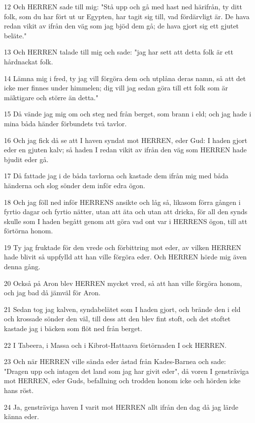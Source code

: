 \par 12 Och HERREN sade till mig: "Stå upp och gå med hast ned härifrån, ty ditt folk, som du har fört ut ur Egypten, har tagit sig till, vad fördärvligt är. De hava redan vikit av ifrån den väg som jag bjöd dem gå; de hava gjort sig ett gjutet beläte."
\par 13 Och HERREN talade till mig och sade: "jag har sett att detta folk är ett hårdnackat folk.
\par 14 Lämna mig i fred, ty jag vill förgöra dem och utplåna deras namn, så att det icke mer finnes under himmelen; dig vill jag sedan göra till ett folk som är mäktigare och större än detta."
\par 15 Då vände jag mig om och steg ned från berget, som brann i eld; och jag hade i mina båda händer förbundets två tavlor.
\par 16 Och jag fick då se att I haven syndat mot HERREN, eder Gud: I haden gjort eder en gjuten kalv; så haden I redan vikit av ifrån den väg som HERREN hade bjudit eder gå.
\par 17 Då fattade jag i de båda tavlorna och kastade dem ifrån mig med båda händerna och slog sönder dem inför edra ögon.
\par 18 Och jag föll ned inför HERRENS ansikte och låg så, likasom förra gången i fyrtio dagar och fyrtio nätter, utan att äta och utan att dricka, för all den synds skulle som I haden begått genom att göra vad ont var i HERRENS ögon, till att förtörna honom.
\par 19 Ty jag fruktade för den vrede och förbittring mot eder, av vilken HERREN hade blivit så uppfylld att han ville förgöra eder. Och HERREN hörde mig även denna gång.
\par 20 Också på Aron blev HERREN mycket vred, så att han ville förgöra honom, och jag bad då jämväl för Aron.
\par 21 Sedan tog jag kalven, syndabelätet som I haden gjort, och brände den i eld och krossade sönder den väl, till dess att den blev fint stoft, och det stoftet kastade jag i bäcken som flöt ned från berget.
\par 22 I Tabeera, i Massa och i Kibrot-Hattaava förtörnaden I ock HERREN.
\par 23 Och när HERREN ville sända eder åstad från Kades-Barnea och sade: "Dragen upp och intagen det land som jag har givit eder", då voren I gensträviga mot HERREN, eder Guds, befallning och trodden honom icke och hörden icke hans röst.
\par 24 Ja, gensträviga haven I varit mot HERREN allt ifrån den dag då jag lärde känna eder.
